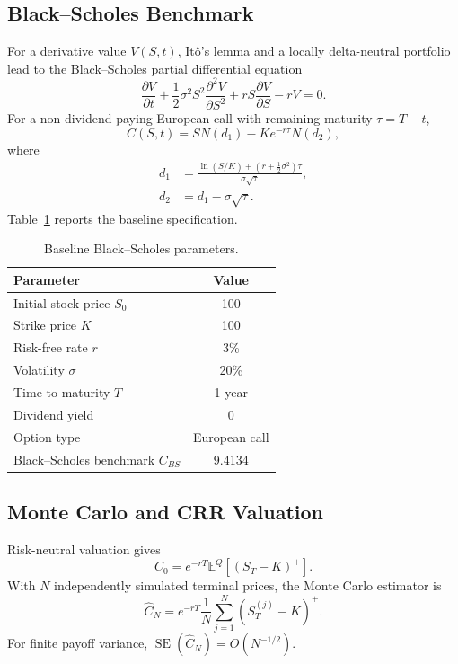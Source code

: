 \documentclass[11pt,a4paper]{article}
\begin{document}
\subsection{Black--Scholes Benchmark}

For a derivative value $V(S,t)$, It\^o's lemma and a locally delta-neutral portfolio lead to the Black--Scholes partial differential equation
\begin{equation}
    \frac{\partial V}{\partial t}
    +\frac{1}{2}\sigma^2S^2\frac{\partial^2V}{\partial S^2}
    +rS\frac{\partial V}{\partial S}-rV=0.
\end{equation}
For a non-dividend-paying European call with remaining maturity $\tau=T-t$,
\begin{equation}
    C(S,t)=SN(d_1)-Ke^{-r\tau}N(d_2),
\end{equation}
where
\begin{align}
    d_1&=\frac{\ln(S/K)+(r+\tfrac{1}{2}\sigma^2)\tau}{\sigma\sqrt{\tau}},\\
    d_2&=d_1-\sigma\sqrt{\tau}.
\end{align}
Table~\ref{tab:baseline} reports the baseline specification.

\begin{table}[H]
\centering
\caption{Baseline Black--Scholes parameters.}
\label{tab:baseline}
\begin{tabular}{lc}
\toprule
Parameter & Value \\
\midrule
Initial stock price $S_0$ & 100 \\
Strike price $K$ & 100 \\
Risk-free rate $r$ & 3\% \\
Volatility $\sigma$ & 20\% \\
Time to maturity $T$ & 1 year \\
Dividend yield & 0 \\
Option type & European call \\
Black--Scholes benchmark $C_{BS}$ & 9.4134 \\
\bottomrule
\end{tabular}
\end{table}

\subsection{Monte Carlo and CRR Valuation}

Risk-neutral valuation gives
\begin{equation}
    C_0=e^{-rT}\mathbb{E}^{Q}[(S_T-K)^+].
\end{equation}
With $N$ independently simulated terminal prices, the Monte Carlo estimator is
\begin{equation}
    \widehat C_N=e^{-rT}\frac{1}{N}\sum_{j=1}^{N}(S_T^{(j)}-K)^+.
\end{equation}
For finite payoff variance, $\operatorname{SE}(\widehat C_N)=O(N^{-1/2})$.
\end{document}
